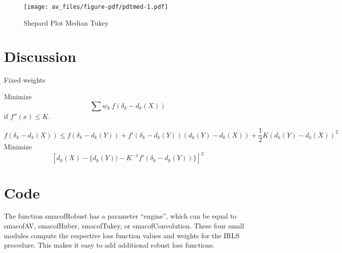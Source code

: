 \documentclass[
  12pt,
  letterpaper,
  DIV=11,
  numbers=noendperiod]{scrartcl}
\begin{document}
\begin{figure}[H]

{\centering \texttt{[image: av\_files/figure-pdf/pdtmed-1.pdf]}

}

\caption{Shepard Plot Median Tukey}

\end{figure}%

\section{Discussion}\label{discussion}

Fixed weights

Minimize \[
\sum w_k\ f(\delta_k-d_k(X))
\] if \(f''(x)\leq K\).

\[
f(\delta_k-d_k(X))\leq f(\delta_k-d_k(Y))+f'(\delta_k-d_k(Y))(d_k(Y)-d_k(X))+\frac12K(d_k(Y)-d_k(X))^2
\] Minimize \[
\left[d_k(X)-\{d_k(Y))-K^{-1}f'(\delta_k-d_k(Y))\}\right]^2
\]

\section{Code}\label{code}

The function smacofRobust has a parameter ``engine'', which can be equal
to smacofAV, smacofHuber, smacofTukey, or smacofConvolution. These four
small modules compute the respective loss function values and weights
for the IRLS procedure. This makes it easy to add additional robust loss
functions.
\end{document}
